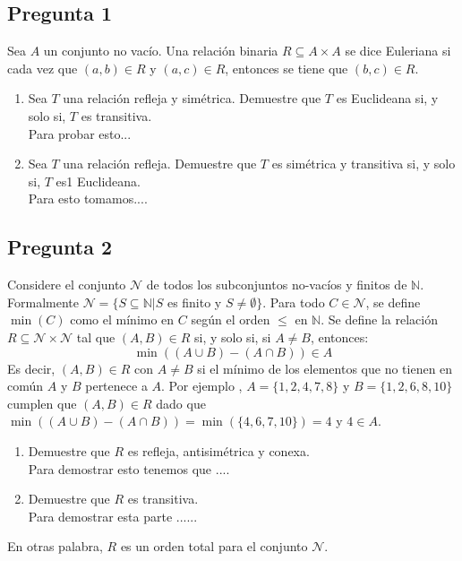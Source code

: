 \documentclass[letter]{article}
\begin{document}
	
	\begin{pregunta}{1} %
		\section*{Pregunta 1}
		Sea $A$ un conjunto no vacío. Una relación binaria $R\subseteq A \times A$ se dice Euleriana si cada vez que $(a, b) \in R$ y $(a,c) \in R$, entonces se tiene que $(b,c) \in R$.
		\begin{enumerate}
		\item Sea $T$ una relación refleja y simétrica. Demuestre que $T$ es Euclideana si, y solo si, $T$ es transitiva.\\
		
		Para probar esto...
		\item Sea $T$ una relación refleja. Demuestre que $T$ es simétrica y transitiva si, y solo si, $T$ es1 Euclideana.\\
		
		Para esto tomamos....
		\end{enumerate}
		
	\end{pregunta}
	
	\begin{pregunta}{2}
		\section*{Pregunta 2}
		Considere el conjunto $\mathcal{N}$ de todos los subconjuntos no-vacíos y finitos de $\mathbb{N}$. Formalmente $\mathcal{N} = \{S \subseteq \mathbb{N}| S$ es finito y $S\neq \emptyset\}$. Para todo $C\in \mathcal{N}$, se define $\min(C)$ como el mínimo en $C$ según el orden $\leq$ en $\mathbb{N}$. Se define la relación $R \subseteq \mathcal{N}\times \mathcal{N}$ tal que $(A,B)\in R$ si, y solo si, si $A\neq B$, entonces:
		$$\min\left((A\cup B)-(A \cap B)\right) \in A$$
		Es decir, $(A,B) \in R$ con $A\neq B$ si el mínimo de los elementos que no tienen en común $A$ y $B$ pertenece a $A$. Por ejemplo , $A = \{1,2,4,7,8\} $ y $B = \{1,2,6,8,10\}$ cumplen que $(A,B) \in R$ dado que $\min\left((A\cup B) - (A\cap B)\right) = \min\left(\{4,6,7,10\}\right) = 4$ y $4\in A$.
		\begin{enumerate}
		\item Demuestre que $R$ es refleja, antisimétrica y conexa.\\
		
		Para demostrar esto tenemos que ....
		\item Demuestre que $R$ es transitiva.\\
		
		Para demostrar esta parte ......
		\end{enumerate}
	En otras palabra, $R$ es un orden total para el conjunto $\mathcal{N}$.
	\end{pregunta}
\end{document}
